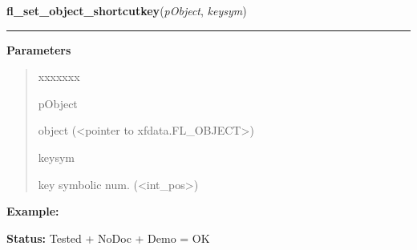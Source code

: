 \hspace{.8\funcindent}\begin{boxedminipage}{\funcwidth}

    \raggedright \textbf{fl\_set\_object\_shortcutkey}(\textit{pObject}, \textit{keysym})

    \vspace{-1.5ex}

    \rule{\textwidth}{0.5\fboxrule}
\setlength{\parskip}{2ex}
\setlength{\parskip}{1ex}
      \textbf{Parameters}
      \vspace{-1ex}

      \begin{quote}
        \begin{Ventry}{xxxxxxx}

          \item[pObject]

          object ({\textless}pointer to xfdata.FL\_OBJECT{\textgreater})

          \item[keysym]

          key symbolic num. ({\textless}int\_pos{\textgreater})

        \end{Ventry}

      \end{quote}

\textbf{Example:} 

\textbf{Status:} Tested + NoDoc + Demo = OK



    \end{boxedminipage}

    \label{xformslib:library:fl_set_object_dblbuffer}

    \vspace{0.5ex}

